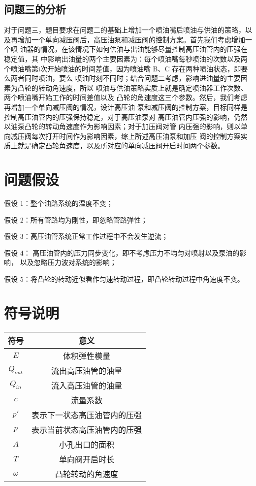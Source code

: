 \documentclass{cumcmthesis}
\begin{document}
\subsection{问题三的分析}
对于问题三，题目要求在问题二的基础上增加一个喷油嘴后喷油与供油的策略，以 及再增加一个单向减压阀后，高压油泵和减压阀的控制方案。首先我们考虑增加一个喷 油器的情况，在该情况下如何供油与出油能够尽量控制高压油管内的压强在稳定值，其 中影响出油量的两个主要因素为：每个喷油嘴每秒喷油的次数以及两个喷油嘴第i次开始喷油的时间差值，因为喷油嘴 B、C 存在两种喷油状态，即要么两者同时喷油，要么 喷油时刻不同时；结合问题二考虑，影响进油量的主要因素为凸轮的转动角速度，所以 喷油与供油策略实质上就是确定喷油器工作次数、两个喷油嘴开始工作的时间差值以及 凸轮的角速度这三个参数。然后，我们考虑再增加一个单向减压阀的情况，设计高压油 泵和减压阀的控制方案，目标同样是控制高压油管内的压强保持稳定，对于高压油泵对 高压油管内压强的影响，仍然以油泵凸轮的转动角速度作为影响因素；对于加压阀对管 内压强的影响，则以单向减压阀每次打开时间作为影响因素，综上所述高压油泵和加压 阀的控制方案实质上就是确定凸轮角速度，以及所对应的单向减压阀开启时间两个参数。
\section{问题假设}
假设 1：整个油路系统的温度不变； 

假设 2：所有管路均为刚性，即忽略管路弹性； 

假设 3：高压油管系统正常工作过程中不会发生逆流； 

假设 4： 高压油管内的压力同步变化，即不考虑压力不均匀对喷射以及泵油的影响， 以及忽略压力波对系统的影响； 

假设 5：将凸轮的转动近似看作匀速转动过程，即凸轮转动过程中角速度不变。
\section{符号说明}
\begin{center}
\begin{tabular}{cc}
	\toprule[1.5pt]  %
	符号&意义\\
	\midrule[1pt]  %
	$E$&体积弹性模量\\
	$Q_{out}$&流出高压油管的油量\\
	$Q_{in}$&流入高压油管的油量\\
	$c$&流量系数\\
	$p'$&表示下一状态高压油管内的压强\\
	$p$&表示当前状态高压油管内的压强\\
	$A$&小孔出口的面积\\
	$T$&单向阀开启时长\\
	$\omega$&凸轮转动的角速度\\
	\bottomrule[1.5pt] %
\end{tabular}
\end{center}
\end{document}
